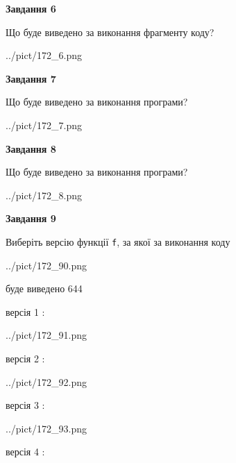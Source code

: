 \documentclass[12pt, ukrainian]{article}
\def\code#1{\Verb!#1!}
\begin{document}
{\begin {large}
{\begin {center}\textbf{Завдання 6}\end {center}}

Що буде виведено за виконання фрагменту коду?\par
\begin{center}
	{../pict/172_6.png}
\end{center}
\newpage

{\begin {center}\textbf{Завдання 7}\end {center}}

Що буде виведено за виконання програми?\par
\begin{center}
	{../pict/172_7.png}
\end{center}
\newpage

{\begin {center}\textbf{Завдання 8}\end {center}}

Що буде виведено за виконання програми?\par
\begin{center}
	{../pict/172_8.png}
\end{center}
\newpage

{\begin {center}\textbf{Завдання 9}\end {center}}

Виберіть версію функції \code{f}, за якої за виконання коду
\begin{center}
	{../pict/172_90.png}
\end{center}
буде виведено 644

\vspace{5mm}
версія 1 :

\begin{center}
	{../pict/172_91.png}
\end{center}
версія 2 :

\begin{center}
	{../pict/172_92.png}
\end{center}
версія 3 :

\begin{center}
	{../pict/172_93.png}
\end{center}
версія 4 :


\end{large}}
\end{document}

